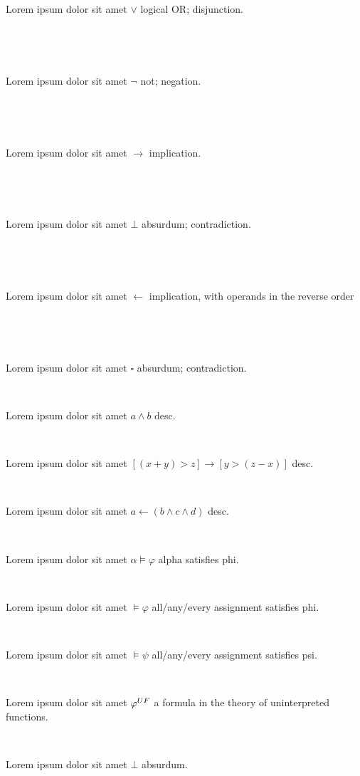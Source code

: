 \documentclass[12pt]{article}
\begin{document}
Lorem ipsum dolor sit amet $ \vee $ logical OR; disjunction.

\centerline{~}

\centerline{~}

Lorem ipsum dolor sit amet $ \neg $ not; negation.

\centerline{~}

\centerline{~}

Lorem ipsum dolor sit amet $ \rightarrow $ implication.

\centerline{~}

\centerline{~}

Lorem ipsum dolor sit amet $ \bot $ absurdum; contradiction.

\centerline{~}

\centerline{~}

Lorem ipsum dolor sit amet $ \leftarrow  $ implication, with operands in the reverse order

\centerline{~}

\centerline{~}

Lorem ipsum dolor sit amet $ \square $ absurdum; contradiction.

\centerline{~}


Lorem ipsum dolor sit amet $ a \wedge b $ desc.

\centerline{~}


Lorem ipsum dolor sit amet $ [ ( x + y ) > z ] \rightarrow [ y > ( z - x ) ] $ desc.

\centerline{~}


Lorem ipsum dolor sit amet $ a \leftarrow ( b \wedge c \wedge d )  $ desc.

\centerline{~}

Lorem ipsum dolor sit amet $ \alpha \vDash \varphi $ alpha satisfies phi.

\centerline{~}

Lorem ipsum dolor sit amet $ \vDash \varphi $ all/any/every assignment satisfies phi.

\centerline{~}

Lorem ipsum dolor sit amet $ \vDash \psi $ all/any/every assignment satisfies psi.

\centerline{~}

Lorem ipsum dolor sit amet $ \varphi^{\scriptsize UF} $ a formula in the theory of uninterpreted functions.

\centerline{~}

Lorem ipsum dolor sit amet $ \bot $ absurdum.

\centerline{~}
\end{document}
